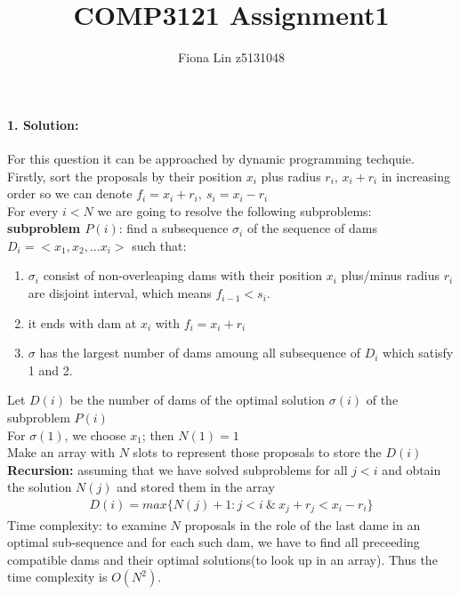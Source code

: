 \documentclass[a4paper]{scrartcl}
\title{COMP3121 Assignment1}
\author{Fiona Lin z5131048}
\begin{document}
\maketitle
\paragraph{1. Solution:}
\label{sec:Question 1}
For this question it can be approached by dynamic programming techquie.\\
Firstly, sort the proposals by their position $x_i$ plus radius $r_i$, $x_i + r_i$ in increasing order so we can denote $f_i = x_i + r_i,\ s_i = x_i - r_i$\\
For every $i < N$ we are going to resolve the following subproblems:\\
\textbf{subproblem $P(i)$}: find a subsequence $\sigma_i$ of the sequence of dams $D_i=\big<x_1,x_2,...x_i\big>$ such that:
\begin{enumerate}[label=(\arabic*)]
  \item $\sigma_i$ consist of non-overleaping dams with their position $x_i$ plus/minus radius $r_i$ are disjoint interval, which means $f_{i-1} < s_i$.
  \item it ends with dam at $x_i$ with $f_i=x_i+r_i$
  \item $\sigma$ has the largest number of dams amoung all subsequence of $D_i$ which satisfy 1 and 2.
\end{enumerate}
Let $D(i)$ be the number of dams of the optimal solution $\sigma(i)$ of the subproblem $P(i)$\\
For $\sigma(1)$, we choose $x_1$; then $N(1)=1$\\
Make an array with $N$ slots to represent those proposals to store the $D(i)$ \\
\textbf{Recursion:} assuming that we have solved subproblems for all $j<i$ and obtain the solution $N(j)$ and stored them in the array
\begin{align*}
  D(i) =  max\{ N(j) + 1 : j < i\ \& \ x_j + r_j < x_i - r_i\}
\end{align*}
Time complexity: to examine $N$ proposals in the role of the last dame in an optimal sub-sequence and for each such dam, we have to find all preceeding compatible dams and their optimal solutions(to look up in an array). Thus the time complexity is $O(N^2)$.
\end{document}
